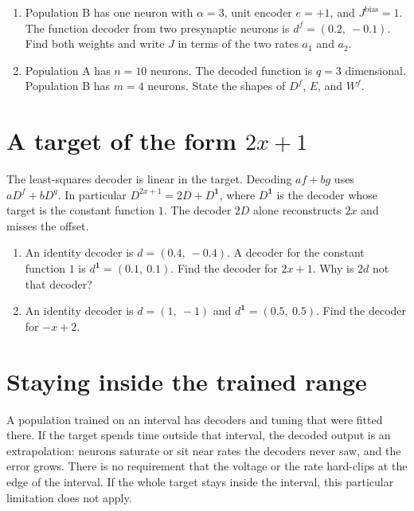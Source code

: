 \documentclass[11pt,letterpaper]{article}
\newcommand{\Jb}{J^{\mathrm{bias}}}
\begin{document}
\begin{enumerate}
\item Population B has one neuron with $\alpha = 3$, unit encoder $e = +1$, and $\Jb = 1$. The function decoder from two presynaptic neurons is $d^f = (0.2,\ -0.1)$. Find both weights and write $J$ in terms of the two rates $a_1$ and $a_2$.
\item Population A has $n = 10$ neurons. The decoded function is $q = 3$ dimensional. Population B has $m = 4$ neurons. State the shapes of $D^f$, $E$, and $W^f$.
\end{enumerate}

\section{A target of the form $2x+1$}

\begin{idea}
The least-squares decoder is linear in the target. Decoding $af + bg$ uses $aD^f + bD^g$. In particular $D^{2x+1} = 2D + D^{\mathbf{1}}$, where $D^{\mathbf{1}}$ is the decoder whose target is the constant function $1$. The decoder $2D$ alone reconstructs $2x$ and misses the offset.
\end{idea}

\begin{enumerate}
\item An identity decoder is $d = (0.4,\ -0.4)$. A decoder for the constant function $1$ is $d^{\mathbf{1}} = (0.1,\ 0.1)$. Find the decoder for $2x + 1$. Why is $2d$ not that decoder?
\item An identity decoder is $d = (1,\ -1)$ and $d^{\mathbf{1}} = (0.5,\ 0.5)$. Find the decoder for $-x + 2$.
\end{enumerate}

\section{Staying inside the trained range}

\begin{idea}
A population trained on an interval has decoders and tuning that were fitted there. If the target spends time outside that interval, the decoded output is an extrapolation: neurons saturate or sit near rates the decoders never saw, and the error grows. There is no requirement that the voltage or the rate hard-clips at the edge of the interval. If the whole target stays inside the interval, this particular limitation does not apply.
\end{idea}
\end{document}
